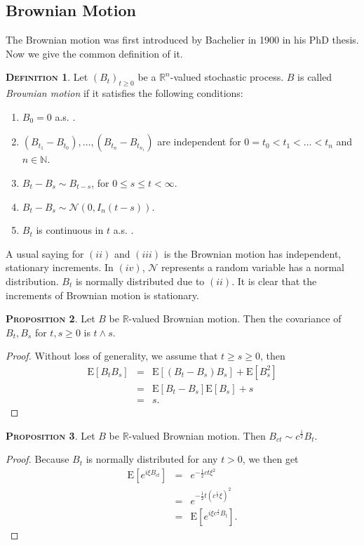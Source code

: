\documentclass[a4paper, twoside, 11pt]{article}
\theoremstyle{definition}
\newtheorem{definition}{\scshape Definition}[section]
\newtheorem{proposition}[definition]{\scshape Proposition}
\begin{document}
  \subsection{Brownian Motion}
  The Brownian motion was first introduced by Bachelier in 1900 in his PhD thesis. Now we give the common definition of it.
  \begin{definition}
  Let $(B_t)_{t\ge0}$ be a $\mathbb{R}^{n}$-valued stochastic process. $B$ is called \emph{Brownian motion} if it satisfies the following conditions:
  \begin{enumerate}[topsep=0pt, itemsep=-1ex, partopsep=1ex, parsep=1ex, label=(\roman*)]
	\item $B_0 = 0 $ a.s. .
	\item $(B_{t_1} - B_{t_0}),\dots,(B_{t_n} - B_{t_{n_1}})$ are independent for $0=t_0<t_1<\dots<t_n$ and $n \in \mathbb{N}$.
	\item $B_t - B_s \sim B_{t-s}$, for $0 \le s \le t < \infty$.
	\item $B_t - B_s \sim \mathcal{N}(0, I_n(t-s))$.
	\item $B_t$ is continuous in $t$ a.s. .
  \end{enumerate}
  \end{definition}
  A usual saying for $(ii)$ and $(iii)$ is the Brownian motion has independent, stationary increments. In $(iv)$, $\mathcal{N}$ represents a random variable has a normal distribution. $B_t$ is normally distributed due to $(ii)$. It is clear that the increments of Brownian motion is stationary.

  \begin{proposition}
	Let $B$ be $\mathbb{R}$-valued Brownian motion. Then the covariance of $B_t, B_s$ for $t, s \ge 0$ is $t \wedge s $.
  \end{proposition}
  \begin{proof}
	Without loss of generality, we assume that $t \ge s \ge 0$, then
	\begin{eqnarray*}
	  \mathrm{E}[B_tB_s] &=& \mathrm{E}[(B_t - B_s)B_s] + \mathrm{E}[B_s^2]\\
	  &=& \mathrm{E}[B_t - B_s]\mathrm{E}[B_s] + s\\
	  &=& s .
	\end{eqnarray*}
	\label{sec:cor}
  \end{proof}

  \begin{proposition}
	Let $B$ be $\mathbb{R}$-valued Brownian motion. Then $B_{ct} \sim c^{\frac{1}{2}}B_t$.
  \end{proposition}
  \begin{proof}
	Because $B_t$ is normally distributed for any $t > 0$, we then get
	\begin{eqnarray*}
	  \mathrm{E} [e^{i\xi B_{ct}}] &=& e^{-\frac{1}{2}ct\xi^2}\\
	  &=& e^{-\frac{1}{2}t(c^{\frac{1}{2}}\xi)^2}\\
	  &=& \mathrm{E} [e^{i\xi c^{\frac{1}{2}}B_t}] .
	\end{eqnarray*}
  \end{proof}
\end{document}
